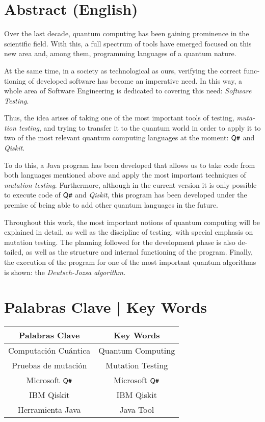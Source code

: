 \section*{Abstract (English)}
\begin{otherlanguage}{british}
Over the last decade, quantum computing has been gaining prominence in the scientific field. With this, a full spectrum of tools have emerged focused on this new area and, among them, programming languages of a quantum nature.

At the same time, in a society as technological as ours, verifying the correct functioning of developed software has become an imperative need. In this way, a whole area of Software Engineering is dedicated to covering this need: \emph{Software Testing}.

Thus, the idea arises of taking one of the most important tools of testing, \textit{mutation testing}, and trying to transfer it to the quantum world in order to apply it to two of the most relevant quantum computing languages at the moment: $\textsf{Q}\texttt{\#}$ and \textit{Qiskit}.

To do this, a Java program has been developed that allows us to take code from both languages mentioned above and apply the most important techniques of \textit{mutation testing}. Furthermore, although in the current version it is only possible to execute code of $\textsf{Q}\texttt{\#}$ and \textit{Qiskit}, this program has been developed under the premise of being able to add other quantum languages in the future.

Throughout this work, the most important notions of quantum computing will be explained in detail, as well as the discipline of testing, with special emphasis on mutation testing. The planning followed for the development phase is also detailed, as well as the structure and internal functioning of the program. Finally, the execution of the program for one of the most important quantum algorithms is shown: the \textit{Deutsch-Jozsa algorithm.}
\end{otherlanguage}

\section*{Palabras Clave | Key Words}

\begin{center}
\begin{tabular}{ |c|c| } 
 \hline
 Palabras Clave & Key Words \\
 \hline\hline 
 Computación Cuántica & Quantum Computing \\ 
 Pruebas de mutación  & Mutation Testing \\
 Microsoft $\textsf{Q}\texttt{\#}$     & Microsoft $\textsf{Q}\texttt{\#}$ \\
 IBM Qiskit  		  & IBM Qiskit \\
 Herramienta Java  	  & Java Tool \\ 
 \hline
\end{tabular}
\end{center}

